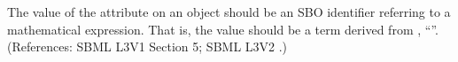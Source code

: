 The value of the attribute  on an \Event object should be
an SBO identifier referring to a mathematical expression.  That is, the
value should be a term derived from \sbointeractionID,
``''.  (References: SBML L3V1 Section 5; SBML L3V2 .)
